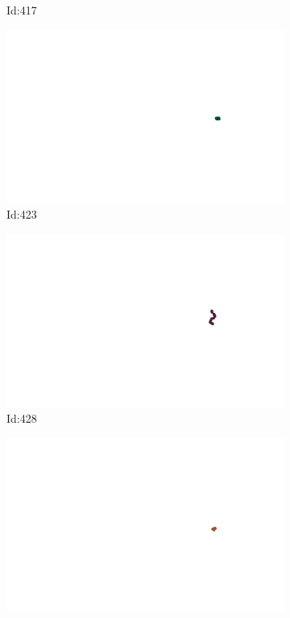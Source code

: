 \documentclass[12pt,twoside]{report}
\begin{document}
\begin{figure}
\begin{subfigure}[b]{0.20\textwidth}
\caption{Id:417}
\end{subfigure}
\begin{subfigure}[b]{0.20\textwidth}
\centering
\includegraphics[width=\textwidth]{../trajectories/423.png}
\caption{Id:423}
\end{subfigure}
\begin{subfigure}[b]{0.20\textwidth}
\centering
\includegraphics[width=\textwidth]{../trajectories/428.png}
\caption{Id:428}
\end{subfigure}
\begin{subfigure}[b]{0.20\textwidth}
\centering
\includegraphics[width=\textwidth]{../trajectories/429.png}

\end{subfigure}
\end{figure}
\end{document}
